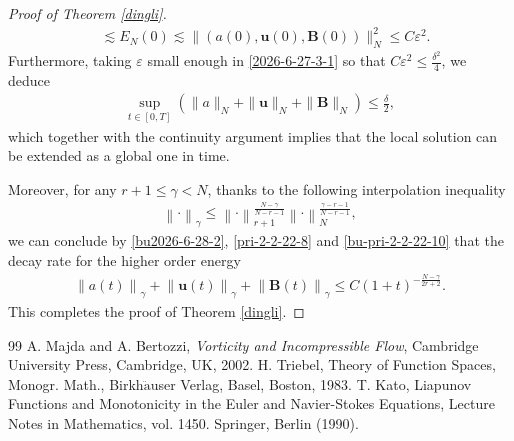 \documentclass[10pt,a4paper]{amsart}
\def\b{ \mathbf{B} }
\newcommand{\norm}[2]{\left\lVert #1 \right\rVert_{#2}}
\def\u{ \mathbf{u} }
\begin{document}
\begin{proof}[Proof of Theorem \ref{dingli}]
\begin{equation}
\begin{split}
&\lesssim E_{N}(0)\lesssim\big\|(a(0),\u(0),\b(0))\big\|^2_{N}\le C\varepsilon^2.\end{split}\end{equation}
Furthermore, taking $\varepsilon$ small enough in \eqref{2026-6-27-3-1} so that $C\varepsilon^2\le \frac{\delta^2}{4}$, we deduce
\begin{align}\label{ping23-3}
\sup_{t\in[0,T]}(\|a\|_{{N}}+\|\u\|_{{N}}+\|\b\|_{{N}})\le \frac{\delta}{2},
\end{align}
which together with  the continuity argument  implies that the local solution
can be extended as a global one in time.

Moreover, for any $r+1\leq\gamma< N $,  thanks to the following interpolation inequality
\begin{align*}%
	\norm{\cdot}{{\gamma}}\le\norm{\cdot}{{r+1}}^{\frac{{N}-\gamma}{{N}-r-1}}
	\norm{\cdot}{{N}}^{\frac{\gamma-r-1}{{N}-r-1}},
\end{align*}
we can conclude by \eqref{bu2026-6-28-2}, \eqref{pri-2-2-22-8} and \eqref{bu-pri-2-2-22-10} that  the   decay rate for the higher order energy
\begin{align*}%
\norm{a(t)}{{\gamma}}+\norm{\u(t)}{{\gamma}}+\norm{\b(t)}{{\gamma}}\le C(1+t)^{-\frac{N-\gamma}{2r+2}}.
\end{align*}
This completes the proof of Theorem \ref{dingli}.\end{proof}

\begin{thebibliography}{99}
 A. Majda and A. Bertozzi, {\it Vorticity and Incompressible Flow}, Cambridge University Press, Cambridge, UK, 2002.
 H. Triebel, Theory of Function Spaces, Monogr. Math., Birkh$\ddot{\mathrm{a}}$user Verlag, Basel, Boston, 1983.
 T. Kato, Liapunov Functions and Monotonicity in the Euler and Navier-Stokes Equations, Lecture Notes in Mathematics, vol. 1450. Springer, Berlin (1990).
\end{thebibliography}
\end{document}
